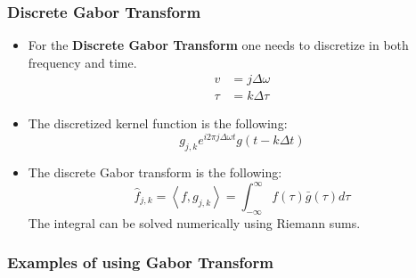 \documentclass[11.5pt,a4paper]{article}
\begin{document}
\subsubsection*{Discrete Gabor Transform}

\begin{itemize}
    \item For the \textbf{Discrete Gabor Transform} one needs to discretize in both frequency and time.
    \begin{align*}
        v &= j\Delta\omega \\
        \tau &= k\Delta\tau
    \end{align*}
    \item The discretized kernel function is the following:
    \begin{equation*}
        g_{j,k} e^{i2\pi j\Delta\omega t}g(t-k\Delta t)
    \end{equation*}
    \item The discrete Gabor transform is the following:
    \begin{equation*}
        \hat{f}_{j, k} = \left<f,g_{j,k}\right> = \int_{-\infty}^{\infty} f(\tau)\bar{g}(\tau)d\tau
    \end{equation*}
    The integral can be solved numerically using Riemann sums.
\end{itemize}

\subsubsection*{Examples of using Gabor Transform}
\end{document}
